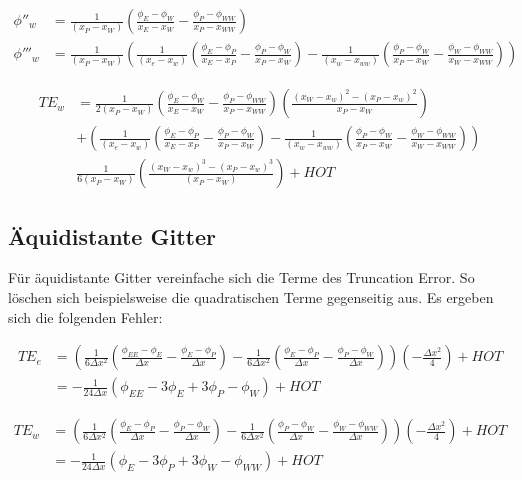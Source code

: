 \documentclass[10pt, ngerman,colorback,accentcolor=tud2d]{tudreport}
\begin{document}
\begin{align*}
  \phi''_w &= \frac{1}{(x_P-x_W)}\left({
\frac{\phi_{E}-\phi_W}{x_{E}-x_W}-\frac{\phi_P-\phi_{WW}}{x_P-x_{WW}}}\right)\\
 \phi'''_w &= \frac{1}{(x_P-x_W)}\left({
\frac{1}{(x_e-x_w)}
\left({\frac{\phi_E-\phi_P}{x_E-x_P}-\frac{\phi_P-\phi_W}{x_P-x_W} }\right)
-\frac{1}{(x_w-x_{ww})}
\left({\frac{\phi_P-\phi_W}{x_P-x_W} - \frac{\phi_W-\phi_{WW}}{x_W-x_{WW}}  }\right)
}\right)
\end{align*}

\begin{align*}
  TE_w &= \frac{1}{2 (x_P-x_W)} \left({
\frac{\phi_{E}-\phi_W}{x_{E}-x_W}-\frac{\phi_P-\phi_{WW}}{x_P-x_{WW}}}\right)
  \left({\frac{{(x_W-x_w)}^2-{(x_P-x_w)}^2}{x_P-x_W}}\right)\\
&+
\left({
\frac{1}{(x_e-x_w)}
\left({\frac{\phi_E-\phi_P}{x_E-x_P}-\frac{\phi_P-\phi_W}{x_P-x_W} }\right)
-\frac{1}{(x_w-x_{ww})}
\left({\frac{\phi_P-\phi_W}{x_P-x_W} - \frac{\phi_W-\phi_{WW}}{x_W-x_{WW}}  }\right)
}\right)\\
&\frac{1}{6(x_P-x_W)}\left({\frac{{(x_W-x_w)}^3-{(x_P-x_w)}^3}{(x_P-x_W)}}\right)
  +HOT
\end{align*}

\subsection{Äquidistante Gitter}

Für äquidistante Gitter vereinfache sich die Terme des Truncation Error. So löschen
sich beispielsweise die quadratischen Terme gegenseitig aus. Es ergeben sich die
folgenden Fehler:

\begin{align*}
  {TE}_e &= \left({
\frac{1}{6\Delta x^2}
\left({\frac{\phi_{EE}-\phi_E}{\Delta x}-\frac{\phi_E-\phi_P}{\Delta x} }\right)
-\frac{1}{6\Delta x^2}
\left({\frac{\phi_E-\phi_P}{\Delta x} - \frac{\phi_P-\phi_W}{\Delta x}  }\right)
}\right)\left({-\frac{\Delta x^2}{4} }\right)+HOT\\
&= -\frac{1}{24\Delta x}\left({
\phi_{EE}-3\phi_E+3\phi_P-\phi_W}\right)+HOT
\end{align*}

\begin{align*}
  TE_w &=\left({
\frac{1}{6 \Delta x^2}
\left({\frac{\phi_E-\phi_P}{\Delta x}-\frac{\phi_P-\phi_W}{\Delta x} }\right)
-\frac{1}{6\Delta x^2}
\left({\frac{\phi_P-\phi_W}{\Delta x} - \frac{\phi_W-\phi_{WW}}{\Delta x}  }\right)
}\right)
\left({-\frac{\Delta x^2}{4} }\right)+HOT\\
&= -\frac{1}{24 \Delta x}\left({
\phi_E-3\phi_P+3\phi_W-\phi_{WW}}\right)+HOT
\end{align*}
\end{document}
